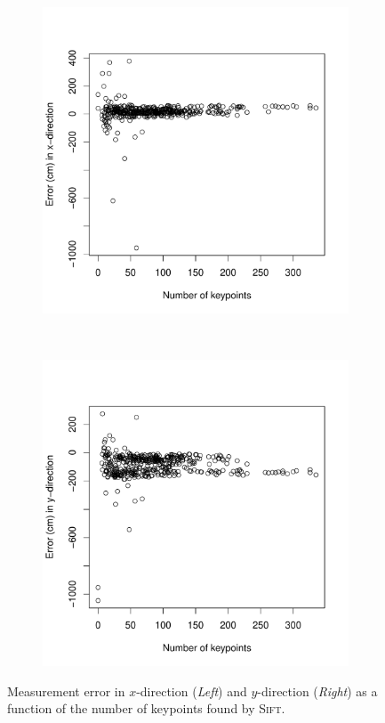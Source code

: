 \documentclass{report}
\begin{document}
\begin{figure}
  \label{fig:cor_keypoints}
  \centering
  \begin{subfigure}[b]{0.5\textwidth}
  \includegraphics[width=1\textwidth]{keypoints_error_x1}
  \label{fig:cosinesim}
  \end{subfigure}%
~
  \begin{subfigure}[b]{0.5\textwidth}
  \includegraphics[width=1\textwidth]{keypoints_error_y}
  \label{fig:cosinesd}
  \end{subfigure}
  \caption{Measurement error in $x$-direction (\emph{Left}) and
    $y$-direction (\emph{Right}) as a function of the number of
    keypoints found by \textsc{Sift}.}
\label{fig:cosine}
\end{figure}
\end{document}

